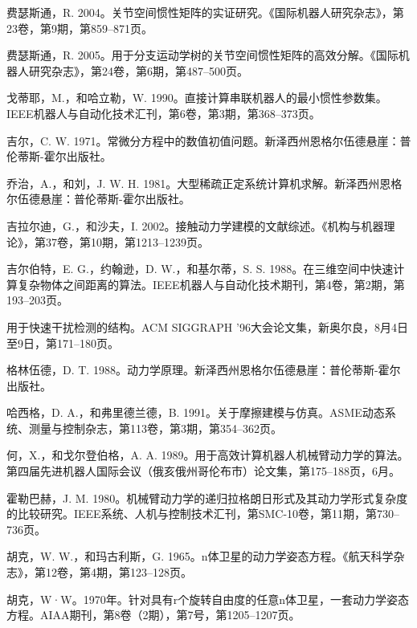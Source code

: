 \documentclass[10pt,a4paper]{book}
\theoremstyle{thmstyle} %
\theoremstyle{defstyle} %
\theoremstyle{prostyle} %
\begin{document}
费瑟斯通，R. 2004。关节空间惯性矩阵的实证研究。《国际机器人研究杂志》，第23卷，第9期，第859–871页。



费瑟斯通，R. 2005。用于分支运动学树的关节空间惯性矩阵的高效分解。《国际机器人研究杂志》，第24卷，第6期，第487–500页。



戈蒂耶，M.，和哈立勒，W. 1990。直接计算串联机器人的最小惯性参数集。IEEE机器人与自动化技术汇刊，第6卷，第3期，第368–373页。



吉尔，C. W. 1971。常微分方程中的数值初值问题。新泽西州恩格尔伍德悬崖：普伦蒂斯-霍尔出版社。



乔治，A.，和刘，J. W. H. 1981。大型稀疏正定系统计算机求解。新泽西州恩格尔伍德悬崖：普伦蒂斯-霍尔出版社。



吉拉尔迪，G.，和沙夫，I. 2002。接触动力学建模的文献综述。《机构与机器理论》，第37卷，第10期，第1213–1239页。



吉尔伯特，E. G.，约翰逊，D. W.，和基尔蒂，S. S. 1988。在三维空间中快速计算复杂物体之间距离的算法。IEEE机器人与自动化技术期刊，第4卷，第2期，第193–203页。



用于快速干扰检测的结构。ACM SIGGRAPH '96大会论文集，新奥尔良，8月4日至9日，第171–180页。



格林伍德，D. T. 1988。动力学原理。新泽西州恩格尔伍德悬崖：普伦蒂斯-霍尔出版社。



哈西格，D. A.，和弗里德兰德，B. 1991。关于摩擦建模与仿真。ASME动态系统、测量与控制杂志，第113卷，第3期，第354–362页。



何，X.，和戈尔登伯格，A. A. 1989。用于高效计算机器人机械臂动力学的算法。第四届先进机器人国际会议（俄亥俄州哥伦布市）论文集，第175–188页，6月。



霍勒巴赫，J. M. 1980。机械臂动力学的递归拉格朗日形式及其动力学形式复杂度的比较研究。IEEE系统、人机与控制技术汇刊，第SMC-10卷，第11期，第730–736页。



胡克，W. W.，和玛古利斯，G. 1965。n体卫星的动力学姿态方程。《航天科学杂志》，第12卷，第4期，第123–128页。



胡克，W·W。1970年。针对具有r个旋转自由度的任意n体卫星，一套动力学姿态方程。AIAA期刊，第8卷（2期），第7号，第1205–1207页。
\end{document}
